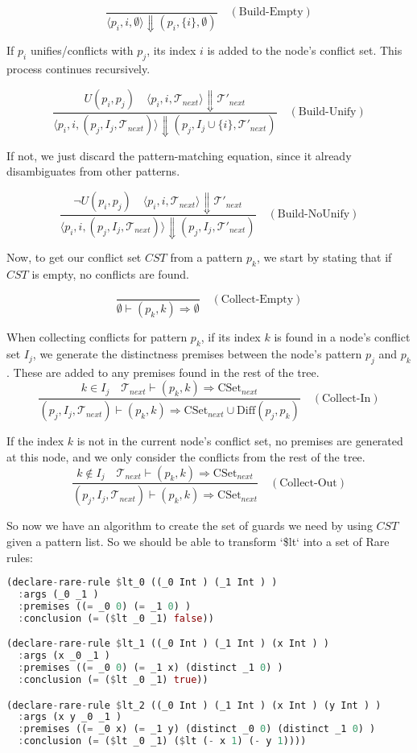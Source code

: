 \documentclass{article}
\begin{document}
$$\frac{}{\langle p_i, i, \emptyset \rangle \Downarrow (p_i, \{i\}, \emptyset)} \quad (\text{Build-Empty})$$

If $p_i$ unifies/conflicts with $p_j$, its index $i$ is added to the node's conflict set. This process continues recursively.

$$\frac{U(p_i, p_j) \quad \langle p_i, i, \mathcal{T}_{next} \rangle \Downarrow \mathcal{T}'_{next}}{\langle p_i, i, (p_j, I_j, \mathcal{T}_{next}) \rangle \Downarrow (p_j, I_j \cup \{i\}, \mathcal{T}'_{next})} \quad (\text{Build-Unify})$$

If not, we just discard the pattern-matching equation, since it already disambiguates from other patterns.

$$\frac{\neg U(p_i, p_j) \quad \langle p_i, i, \mathcal{T}_{next} \rangle \Downarrow \mathcal{T}'_{next}}{\langle p_i, i, (p_j, I_j, \mathcal{T}_{next}) \rangle \Downarrow (p_j, I_j, \mathcal{T}'_{next})} \quad (\text{Build-NoUnify})$$ 

Now, to get our conflict set $CST$ from a pattern $p_k$, we start by stating that if $CST$ is empty, no conflicts are found.

$$\frac{}{\emptyset \vdash (p_k, k) \Rightarrow \emptyset} \quad (\text{Collect-Empty})$$

When collecting conflicts for pattern $p_k$, if its index $k$ is found in a node's conflict set $I_j$, we generate the distinctness premises between the node's pattern $p_j$ and $p_k$. These are added to any premises found in the rest of the tree.
$$\frac{k \in I_j \quad \mathcal{T}_{next} \vdash (p_k, k) \Rightarrow \text{CSet}_{next}}{(p_j, I_j, \mathcal{T}_{next}) \vdash (p_k, k) \Rightarrow \text{CSet}_{next} \cup \text{Diff}(p_j, p_k)} \quad (\text{Collect-In})$$

If the index $k$ is not in the current node's conflict set, no premises are generated at this node, and we only consider the conflicts from the rest of the tree.
$$\frac{k \notin I_j \quad \mathcal{T}_{next} \vdash (p_k, k) \Rightarrow \text{CSet}_{next}}{(p_j, I_j, \mathcal{T}_{next}) \vdash (p_k, k) \Rightarrow \text{CSet}_{next}} \quad (\text{Collect-Out})$$

So now we have an algorithm to create the set of guards we need by using $CST$ given a pattern list. So we should be able to transform `\$lt` into a set of Rare rules:

\begin{lstlisting}[language=Rust]
(declare-rare-rule $lt_0 ((_0 Int ) (_1 Int ) )
  :args (_0 _1 )
  :premises ((= _0 0) (= _1 0) )
  :conclusion (= ($lt _0 _1) false))

(declare-rare-rule $lt_1 ((_0 Int ) (_1 Int ) (x Int ) )
  :args (x _0 _1 )
  :premises ((= _0 0) (= _1 x) (distinct _1 0) )
  :conclusion (= ($lt _0 _1) true))

(declare-rare-rule $lt_2 ((_0 Int ) (_1 Int ) (x Int ) (y Int ) )
  :args (x y _0 _1 )
  :premises ((= _0 x) (= _1 y) (distinct _0 0) (distinct _1 0) )
  :conclusion (= ($lt _0 _1) ($lt (- x 1) (- y 1))))
\end{lstlisting}
\end{document}
